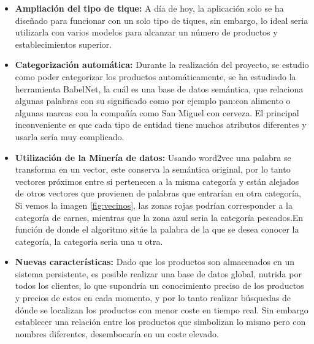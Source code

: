 \begin{itemize}
	\item \textbf{Ampliación del tipo de tique:} A día de hoy, la aplicación solo se ha diseñado para funcionar con un solo tipo de tiques, sin embargo, lo ideal seria utilizarla con varios modelos para alcanzar un número de productos y establecimientos superior.
	\item \textbf{Categorización automática:} Durante la realización del proyecto, se estudio como poder categorizar los productos automáticamente, se ha estudiado la herramienta BabelNet, la cuál es una base de datos semántica, que relaciona algunas palabras  con su significado como por ejemplo pan:con alimento o algunas marcas con la compañía como San Miguel con cerveza. El principal inconveniente es que cada tipo de entidad tiene muchos atributos diferentes y usarla sería muy complicado.
	\item \textbf{Utilización de la Minería de datos:} Usando word2vec una palabra se transforma en un vector, este conserva la semántica original, por lo tanto vectores próximos entre si pertenecen a la misma categoría y están alejados de otros vectores que provienen de palabras que entrarían en otra categoría, Si vemos la imagen \ref{fig:vecinos}, las zonas rojas podrían corresponder a la categoría de carnes, mientras que la zona azul seria la categoría pescados.En función de donde el algoritmo sitúe la palabra de la que se desea conocer la categoría, la categoría seria una u otra.
	
	\item \textbf{Nuevas características:} Dado que los productos son almacenados en un sistema persistente, es posible realizar una base de datos global, nutrida por todos los clientes, lo que supondría un conocimiento preciso de los productos y precios de estos en cada momento, y por lo tanto realizar búsquedas de dónde se localizan los productos con menor coste en tiempo real. Sin embargo establecer una relación entre los productos que simbolizan lo mismo pero con nombres diferentes, desembocaría en un coste elevado.
\end{itemize}
